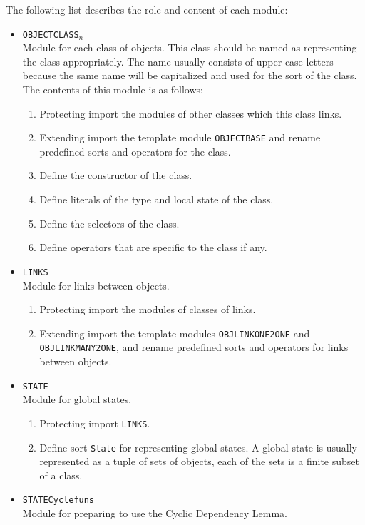 \documentclass[12pt]{report}
\begin{document}
The following list describes the role and content of each module:
\begin{itemize}
\item {\tt OBJECTCLASS}\Large$_n$\normalsize\\
  Module for each class of objects. This class should be named as
  representing the class appropriately. The name usually consists
  of upper case letters because the same name will be capitalized
  and used for the sort of the class. The contents of this module
  is as follows:
  \begin{enumerate}
  \item Protecting import the modules of other classes which this
    class links.
  \item Extending import the template module {\tt OBJECTBASE} and
    rename predefined sorts and operators for the class.
  \item Define the constructor of the class.
  \item Define literals of the type and local state of the class.
  \item Define the selectors of the class.
  \item Define operators that are specific to the class if any.
  \end{enumerate}
\item {\tt LINKS}\\
  Module for links between objects. 
  \begin{enumerate}
  \item Protecting import the modules of classes of links.
  \item Extending import the template modules {\tt OBJLINKONE2ONE} and
    {\tt OBJLINKMANY2ONE}, and rename predefined sorts and operators
    for links between objects.
  \end{enumerate}
\item {\tt STATE}\\
  Module for global states.
  \begin{enumerate}
  \item Protecting import {\tt LINKS}.
  \item Define sort {\tt State} for representing global states.  A
    global state is usually represented as a tuple of sets of objects,
    each of the sets is a finite subset of a class.
  \end{enumerate}
\item {\tt STATECyclefuns}\\
  Module for preparing to use the Cyclic Dependency Lemma.

\end{itemize}
\end{document}
